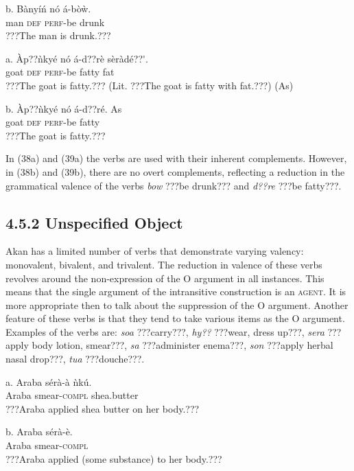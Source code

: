 \documentclass[output=paper]{langsci/langscibook}
\begin{document}
\ea
\gll  b.  Bànyíń  nó  á-bòẁ.\\
       man  \textsc{def}  \textsc{perf}{}-be drunk\\
\glt ???The man is drunk.???
\z

\ea
\gll a.  \`{A}p??ǹkyé  nó  á-d??rè      sèràdé??\'{ }.\\
       goat    \textsc{def}  \textsc{perf}{}-be fatty    fat\\
\glt   ???The goat is fatty.??? (Lit. ???The goat is fatty with fat.???) (As)
\z

\ea
\gll  b.  \`{A}p??ǹkyé  nó  á-d??ré.      As\\
       goat    \textsc{def}  \textsc{perf}{}-be fatty  \\
\glt   ???The goat is fatty.???
\z

In (38a) and (39a) the verbs are used with their inherent complements. However, in (38b) and (39b), there are no overt complements, reflecting a reduction in the grammatical valence of the verbs \emph{bow} ???be drunk??? and \emph{d??re} ???be fatty???.

\subsection{4.5.2  Unspecified Object}

Akan has a limited number of verbs that demonstrate varying valency: monovalent, bivalent, and trivalent. The reduction in valence of these verbs revolves around the non-expression of the O argument in all instances. This means that the single argument of the intransitive construction is an \textsc{agent}. It is more appropriate then to talk about the suppression of the O argument. Another feature of these verbs is that they tend to take various items as the O argument. Examples of the verbs are: \emph{soa} ???carry???, \emph{hy??} ???wear, dress up???, \emph{sera} ???apply body lotion, smear???, \emph{sa} ???administer enema???, \emph{son} ???apply herbal nasal drop???, \emph{tua} ???douche???.


\ea
\gll a.  Araba  sérà-à    ǹkú.\\
       Araba  smear-\textsc{compl}  shea.butter\\
\glt ???Araba applied shea butter on her body.???
\z

\ea
\gll  b.  Araba  sérà-è.\\
       Araba  smear-\textsc{compl}\\
\glt ???Araba applied (some substance) to her body.???
\z
\end{document}
